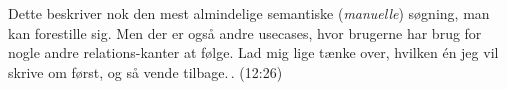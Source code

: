\documentclass{report}
\begin{document}
Dette beskriver nok den mest almindelige semantiske (\emph{manuelle}) søgning, man kan forestille sig. Men der er også andre usecases, hvor brugerne har brug for nogle andre relations-kanter at følge. Lad mig lige tænke over, hvilken én jeg vil skrive om først, og så vende tilbage.\,. (12:26)


\end{document}
